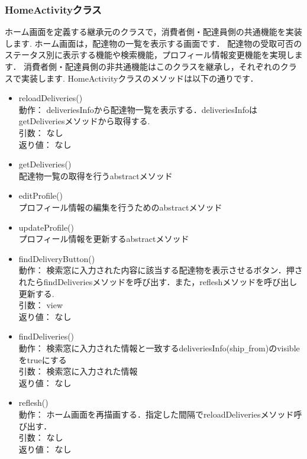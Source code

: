 \documentclass[a4j,titlepage]{jarticle}
\begin{document}
\subsubsection{HomeActivityクラス}
ホーム画面を定義する継承元のクラスで，消費者側・配達員側の共通機能を実装します.
ホーム画面は，配達物の一覧を表示する画面です．
配達物の受取可否のステータス別に表示する機能や検索機能，プロフィール情報変更機能を実現します．
消費者側・配達員側の非共通機能はこのクラスを継承し，それぞれのクラスで実装します.
HomeActivityクラスのメソッドは以下の通りです．
\begin{itemize}
\item reloadDeliveries()\\
  動作： deliveriesInfoから配達物一覧を表示する．deliveriesInfoはgetDeliveriesメソッドから取得する.\\
  引数： なし\\
  返り値： なし

  \item getDeliveries()\\
   配達物一覧の取得を行うabstractメソッド\\

  \item editProfile()\\
   プロフィール情報の編集を行うためのabstractメソッド\\

  \item updateProfile()\\
    プロフィール情報を更新するabstractメソッド\\

  \item findDeliveryButton()\\
  動作：  検索窓に入力された内容に該当する配達物を表示させるボタン．押されたらfindDeliveriesメソッドを呼び出す．また，refleshメソッドを呼び出し更新する.\\
  引数：  view\\
  返り値：  なし

  \item findDeliveries()\\
  動作：  検索窓に入力された情報と一致するdeliveriesInfo(ship\verb|_|from)のvisibleをtrueにする\\
  引数：  検索窓に入力された情報\\
  返り値：  なし
　
  \item reflesh()\\
  動作：  ホーム画面を再描画する．指定した間隔でreloadDeliveriesメソッド呼び出す．\\
  引数：  なし\\
  返り値：  なし


\end{itemize}
\end{document}
